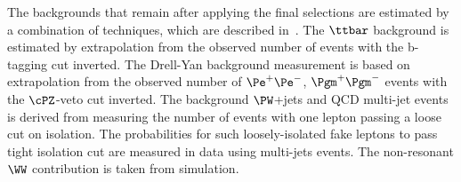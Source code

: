 The backgrounds that remain after applying the final selections are
estimated by a combination of techniques, which are described
in~\cite{cmsobsboson}.  
The $\ttbar$ background is estimated by extrapolation from the observed 
number of events with the b-tagging cut inverted. The Drell-Yan background
measurement is based on extrapolation from the observed number of 
$\Pe^+\Pe^-$, 
$\Pgm^+ \Pgm^-$ events with the $\cPZ$-veto cut inverted. The background 
$\PW$+jets
and QCD multi-jet events is derived from measuring the number of events with
one lepton passing a loose cut on isolation. The probabilities for such 
loosely-isolated fake leptons to pass tight isolation cut are measured in
data 
using multi-jets events. 
The non-resonant $\WW$ contribution is taken from simulation.



